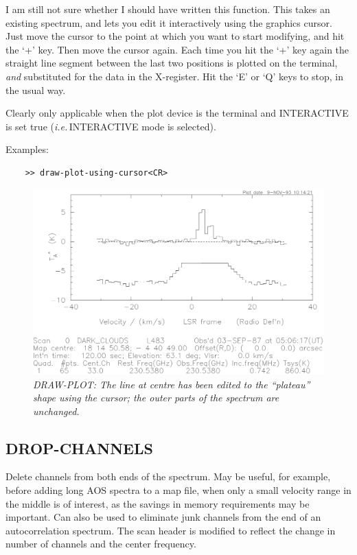 \documentclass[11pt,twoside]{report}
\newcommand{\ie}{{\it i.e.\,}}
\begin{document}
I am still not sure whether I should have written this function. This
takes an existing spectrum, and lets you edit it interactively using the
graphics cursor. Just move the cursor to the point at which you want to
start modifying, and hit the `+' key. Then move the cursor again. Each time
you hit the `+' key again the straight line segment between the last two
positions is plotted on the terminal, {\em and} substituted for the data
in the X-register. Hit the `E' or `Q' keys to stop, in the usual way.

Clearly only applicable when the plot device is the terminal and 
INTERACTIVE is set true (\ie INTERACTIVE mode is selected).

Examples:
\begin{verbatim}
    >> draw-plot-using-cursor<CR>
\end{verbatim}

\begin{figure}[htbp]
\begin{center}
\includegraphics[scale=0.65]{draw-plot.ps}
\protect\parbox{5.5in}
{\caption[DRAW]
{\sl
DRAW-PLOT: The line at centre has been edited to the ``plateau'' shape
using the cursor; the outer parts of the spectrum are unchanged.
\label{DRAW}
}
}
\end{center}
\end{figure}

\subsection{DROP-CHANNELS} 

Delete channels from both ends of the spectrum. May be useful, for example,
before adding long AOS spectra to a map file, when only a small velocity
range in the middle is of interest, as the savings in memory requirements
may be important. Can also be used to eliminate junk channels 
 from the end
of an autocorrelation spectrum. The scan header is modified to reflect
the change in number of channels and the center frequency.
\end{document}
